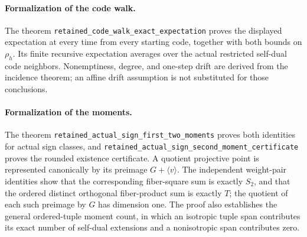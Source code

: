 \paragraph{Formalization of the code walk.} The theorem \texttt{retained\_\allowbreak code\_\allowbreak walk\_\allowbreak exact\_\allowbreak expectation} proves the displayed expectation at every time from every starting code, together with both bounds on $\rho_h$. Its finite recursive expectation averages over the actual restricted self-dual code neighbors. Nonemptiness, degree, and one-step drift are derived from the incidence theorem; an affine drift assumption is not substituted for those conclusions.

\paragraph{Formalization of the moments.} The theorem \texttt{retained\_\allowbreak actual\_\allowbreak sign\_\allowbreak first\_\allowbreak two\_\allowbreak moments} proves both identities for actual sign classes, and \texttt{retained\_\allowbreak actual\_\allowbreak sign\_\allowbreak second\_\allowbreak moment\_\allowbreak certificate} proves the rounded existence certificate. A quotient projective point is represented canonically by its preimage $G+\langle v\rangle$. The independent weight-pair identities show that the corresponding fiber-square sum is exactly $S_2$, and that the ordered distinct orthogonal fiber-product sum is exactly $T$; the quotient of each such preimage by $G$ has dimension one. The proof also establishes the general ordered-tuple moment count, in which an isotropic tuple span contributes its exact number of self-dual extensions and a nonisotropic span contributes zero.
